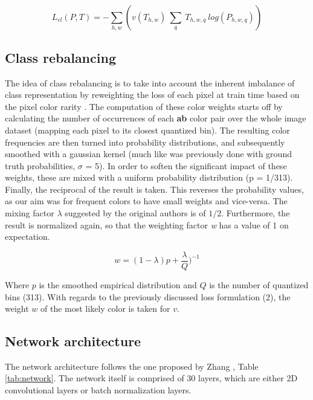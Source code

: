 \documentclass[twoside,twocolumn]{article}
\begin{document}
\begin{equation}
L_{cl}(P,T) = - \sum_{h,w}(v(T_{h,w}) \: \sum_{q} \: T_{h,w,q} \: log(P_{h,w,q}))
\end{equation}

\subsection{Class rebalancing}

The idea of class rebalancing is to take into account the inherent imbalance of class representation by reweighting the loss of each pixel at train time based on the pixel color rarity \cite{Zhang:2016}. The computation of these color weights starts off by calculating the number of occurrences of each \textbf{ab} color pair over the whole image dataset (mapping each pixel to its closest quantized bin). The resulting color frequencies are then turned into probability distributions, and subsequently smoothed with a gaussian kernel (much like was previously done with ground truth probabilities, $\sigma$ = 5). In order to soften the significant impact of these weights, these are mixed with a uniform probability distribution (p = 1/313). Finally, the reciprocal of the result is taken. This reverses the probability values, as our aim was for frequent colors to have small weights and vice-versa. The mixing factor $\lambda$ suggested by the original authors \cite{Zhang:2016} is of $1/2$. Furthermore, the result is normalized again, so that the weighting factor \textit{w} has a value of 1 on expectation.


\begin{equation}
w = (1 - \lambda)p + \frac{\lambda}{Q})^{-1}
\end{equation}

Where $p$ is the smoothed empirical distribution and $Q$ is the number of quantized bins (313). With regards to the previously discussed loss formulation (2), the weight $w$ of the most likely color is taken for $v$.

\subsection{Network architecture}

The network architecture follows the one proposed by Zhang \cite{Zhang:2016}, Table \ref{tab:network}. The network itself is comprised of 30 layers, which are either 2D convolutional layers or batch normalization layers.
\end{document}
